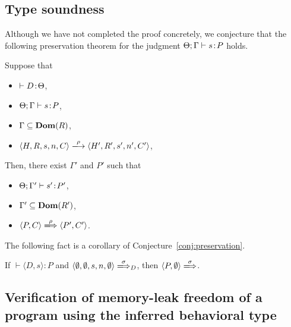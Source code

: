 \subsection{Type soundness}

Although we have not completed the proof concretely, we conjecture that
the following preservation theorem for the judgment $\Theta;\Gamma
\vdash s \!:\! P$ holds.
\begin{conjecture}[Preservation]
 \label{conj:preservation}
 Suppose that
 \begin{itemize}
  \item $\vdash D \!:\! \Theta$,
  \item $\Theta;\Gamma \vdash s \!:\! P$,
  \item $\Gamma \subseteq \mathbf{Dom}(R)$,
  \item $\langle H,R,s,n,C \rangle \xlongrightarrow{\rho} \langle H',R',s',n',C' \rangle$,
 \end{itemize}
 Then, there exist $\Gamma'$ and $P'$ such that
 \begin{itemize}
  \item $\Theta;\Gamma' \vdash s' \!:\! P'$,
  \item $\Gamma' \subseteq \mathbf{Dom}(R')$,
  \item $\langle P,C \rangle \xLongrightarrow{\rho} \langle P',C' \rangle$.
 \end{itemize}
\end{conjecture}


The following fact is a corollary of Conjecture~\ref{conj:preservation}.
\begin{conjecture}\label{cor:progAbstract}
 If $\vdash \langle D, s \rangle : P$ and $\langle \emptyset, \emptyset,
 s, n, \emptyset \rangle \xLongrightarrow{\sigma}_D$, then $\langle P,
 \emptyset \rangle \xLongrightarrow{\sigma}$.
\end{conjecture}

\subsection{Verification of memory-leak freedom of a program using 
the inferred behavioral type}

